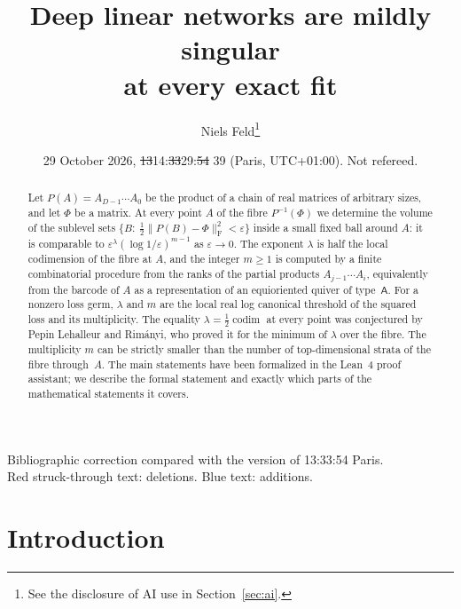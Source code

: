 \documentclass[11pt,a4paper]{article}
\makeatletter
\theoremstyle{definition}
\theoremstyle{remark}
\numberwithin{equation}{section}
\newcommand{\codim}{\operatorname{codim}}
\newcommand{\Fr}[1]{\lVert #1\rVert_{\mathrm F}}
\newcommand{\eps}{\varepsilon}
\providecommand{\DIFaddtex}[1]{{\protect\color{blue}#1}} %
\providecommand{\DIFdeltex}[1]{{\protect\color{red}\sout{#1}}} %
\providecommand{\DIFaddbegin}{} %
\providecommand{\DIFaddend}{} %
\providecommand{\DIFdelbegin}{} %
\providecommand{\DIFdelend}{} %
\providecommand{\DIFadd}[1]{\texorpdfstring{\DIFaddtex{#1}}{#1}} %
\providecommand{\DIFdel}[1]{\texorpdfstring{\DIFdeltex{#1}}{}} %
\let\sout@orig\sout %
\renewcommand{\sout}[1]{\ifmmode\text{\sout@orig{\ensuremath{#1}}}\else\sout@orig{#1}\fi} %
\makeatother
\begin{document}
\title{Deep linear networks are mildly singular\\ at every exact fit}
\author{Niels Feld\thanks{See the disclosure of AI use in Section~\ref{sec:ai}.}}
\date{29 October 2026, \DIFdelbegin \DIFdel{13}\DIFdelend \DIFaddbegin \DIFadd{14}\DIFaddend :\DIFdelbegin \DIFdel{33}\DIFdelend \DIFaddbegin \DIFadd{29}\DIFaddend :\DIFdelbegin \DIFdel{54 }\DIFdelend \DIFaddbegin \DIFadd{39 }\DIFaddend (Paris, UTC+01:00). Not refereed.}

\maketitle
\begin{center}\small Bibliographic correction compared with the version of 13:33:54 Paris.\\ Red struck-through text: deletions. Blue text: additions.\end{center}
\begin{abstract}
Let $P(A)=A_{D-1}\cdots A_0$ be the product of a chain of real matrices of arbitrary sizes, and let $\Phi$ be a matrix. At every point $A$ of the fibre $P^{-1}(\Phi)$ we determine the volume of the sublevel sets $\{B:\ \tfrac12\Fr{P(B)-\Phi}^2<\eps\}$ inside a small fixed ball around $A$: it is comparable to $\eps^{\lambda}(\log 1/\eps)^{m-1}$ as $\eps\to0$. The exponent $\lambda$ is half the local codimension of the fibre at $A$, and the integer $m\ge1$ is computed by a finite combinatorial procedure from the ranks of the partial products $A_{j-1}\cdots A_i$, equivalently from the barcode of $A$ as a representation of an equioriented quiver of type~$\mathsf A$. For a nonzero loss germ, $\lambda$ and $m$ are the local real log canonical threshold of the squared loss and its multiplicity. The equality $\lambda=\tfrac12\codim$ at every point was conjectured by Pepin Lehalleur and Rimányi, who proved it for the minimum of $\lambda$ over the fibre. The multiplicity $m$ can be strictly smaller than the number of top-dimensional strata of the fibre through~$A$. The main statements have been formalized in the Lean~4 proof assistant; we describe the formal statement and exactly which parts of the mathematical statements it covers.
\end{abstract}

\setcounter{tocdepth}{2}
\tableofcontents
\section{Introduction}\label{sec:intro}
\end{document}
